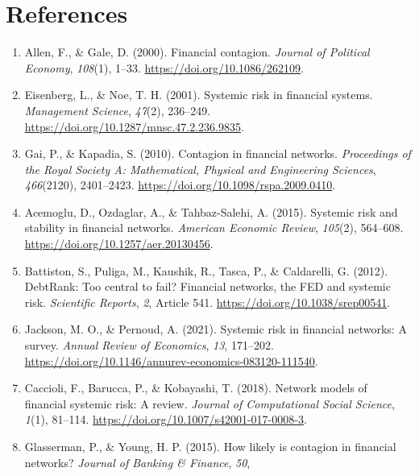 \chapter*{References}

\begingroup
\raggedright
{}
\setlength{\emergencystretch}{3em}

\begin{enumerate}
\def\labelenumi{\arabic{enumi}.}
\item
  Allen, F., \& Gale, D. (2000). Financial contagion. \textit{Journal of
  Political Economy}, \textit{108}(1), 1--33.
  \url{https://doi.org/10.1086/262109}.
\item
  Eisenberg, L., \& Noe, T. H. (2001). Systemic risk in financial
  systems. \textit{Management Science}, \textit{47}(2), 236--249.
  \url{https://doi.org/10.1287/mnsc.47.2.236.9835}.
\item
  Gai, P., \& Kapadia, S. (2010). Contagion in financial networks.
  \textit{Proceedings of the Royal Society A: Mathematical, Physical and
  Engineering Sciences}, \textit{466}(2120), 2401--2423.
  \url{https://doi.org/10.1098/rspa.2009.0410}.
\item
  Acemoglu, D., Ozdaglar, A., \& Tahbaz-Salehi, A. (2015). Systemic risk
  and stability in financial networks. \textit{American Economic Review},
  \textit{105}(2), 564--608.
  \url{https://doi.org/10.1257/aer.20130456}.
\item
  Battiston, S., Puliga, M., Kaushik, R., Tasca, P., \& Caldarelli, G.
  (2012). DebtRank: Too central to fail? Financial networks, the FED and
  systemic risk. \textit{Scientific Reports}, \textit{2}, Article 541.
  \url{https://doi.org/10.1038/srep00541}.
\item
  Jackson, M. O., \& Pernoud, A. (2021). Systemic risk in financial
  networks: A survey. \textit{Annual Review of Economics}, \textit{13},
  171--202.
  \url{https://doi.org/10.1146/annurev-economics-083120-111540}.
\item
  Caccioli, F., Barucca, P., \& Kobayashi, T. (2018). Network models of
  financial systemic risk: A review. \textit{Journal of Computational
  Social Science}, \textit{1}(1), 81--114.
  \url{https://doi.org/10.1007/s42001-017-0008-3}.
\item
  Glasserman, P., \& Young, H. P. (2015). How likely is contagion in
  financial networks? \textit{Journal of Banking \& Finance}, \textit{50},

\end{enumerate}
